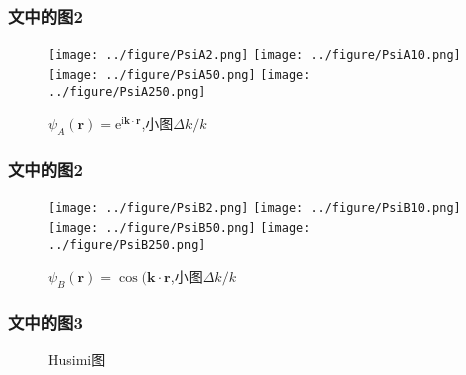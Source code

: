 \documentclass[UTF8]{beamer}
\begin{document}
\begin{frame}
    \frametitle{文中的图2}
    \begin{figure}
        \centering
        \texttt{[image: ../figure/PsiA2.png]}
        \quad
        \texttt{[image: ../figure/PsiA10.png]}
        \quad
        \texttt{[image: ../figure/PsiA50.png]}
        \quad
        \texttt{[image: ../figure/PsiA250.png]}
       \caption{$\psi_A(\mathbf{r})=\mathrm{e}^{\mathrm{i}\mathbf{k}\cdot\mathbf{r}}$,小图$\Delta k/k$}         
    \end{figure}
\end{frame}
\begin{frame}
    \frametitle{文中的图2}
    \begin{figure}
        \centering
        \texttt{[image: ../figure/PsiB2.png]}
        \quad
        \texttt{[image: ../figure/PsiB10.png]}
        \quad
        \texttt{[image: ../figure/PsiB50.png]}
        \quad
        \texttt{[image: ../figure/PsiB250.png]}
       \caption{$\psi_B(\mathbf{r})=\cos (\mathbf{k}\cdot\mathbf{r}$,小图$\Delta k/k$}         
    \end{figure}
\end{frame}
\begin{frame}
    \frametitle{文中的图3}
    \begin{figure}[h]
        \centering
        \qquad
        \caption{Husimi图}
    \end{figure}
\end{frame}
%
\end{document}
